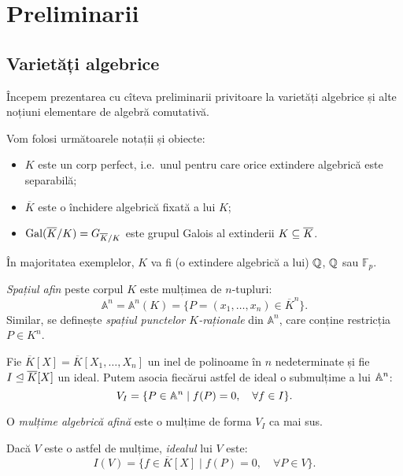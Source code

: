 
\chapter{Preliminarii}

\section{Varietăți algebrice}

Începem prezentarea cu cîteva preliminarii privitoare la varietăți algebrice
și alte noțiuni elementare de algebră comutativă.

Vom folosi următoarele notații și obiecte:
\begin{itemize}
\item $ K $ este un corp perfect, i.e.\ unul pentru care orice extindere algebrică
  este separabilă;
\item $ \overline{K} $ este o închidere algebrică fixată a lui $ K $;
\item $ \mathrm{Gal}(\overline{K}/K) = G_{\overline{K}/K} $ este grupul Galois
  al extinderii $ K \subseteq \overline{K} $.
\end{itemize}

În majoritatea exemplelor, $ K $ va fi (o extindere algebrică a lui) $ \mathbb{Q} $,
$ \mathbb{Q} $ sau $ \mathbb{F}_p $.

\begin{definition}\label{def:spatiu-afin}
  \emph{Spațiul afin} peste corpul $ K $ este mulțimea de $ n $-tupluri:
  \[
    \mathbb{A}^n = \mathbb{A}^n(K) = \{ P = (x_1, \dots, x_n) \in \overline{K}^n \}.
  \]
  Similar, se definește \emph{spațiul punctelor $ K $-raționale} din $ \mathbb{A}^n $,
  care conține restricția $ P \in K^n $.
\end{definition}

Fie $ \overline{K}[X] = \overline{K}[X_1, \dots, X_n] $ un inel de polinoame în $ n $
nedeterminate și fie $ I \trianglelefteq \overline{K}[X] $ un ideal. Putem asocia fiecărui
astfel de ideal o submulțime a lui $ \mathbb{A}^n $:
\[
  V_I = \{ P \in \mathbb{A}^n \mid f(P) = 0, \quad \forall f \in I \}.
\]

\begin{definition}\label{def:multime-algebrica-afina}
  O \emph{mulțime algebrică afină} este o mulțime de forma $ V_I $ ca mai sus.

  Dacă $ V $ este o astfel de mulțime, \emph{idealul} lui $ V $ este:
  \[
    I(V) = \{ f \in \overline{K}[X] \mid f(P) = 0, \quad \forall P \in V \}.
  \]
\end{definition}

